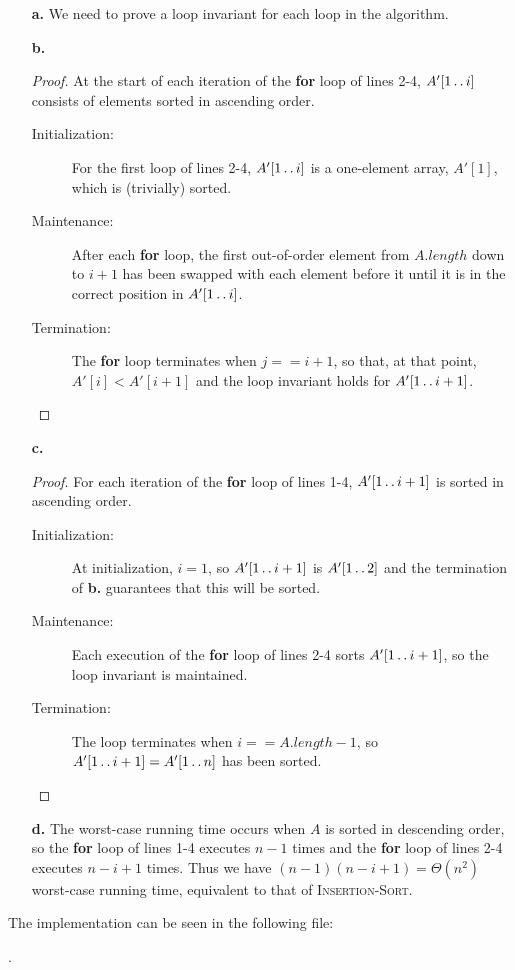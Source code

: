 
\begin{itemize}
    \item[\textbf{a.}] We need to prove a loop invariant for each loop in the algorithm.
    \item[\textbf{b.}]
        \begin{proof}
            At the start of each iteration of the \textbf{for} loop of lines 2-4, 
            $A'[1\mathinner{{\ldotp}\,{\ldotp}} i]$ consists of elements sorted in ascending order.
            \begin{description}
                \item[Initialization:] For the first loop of lines 2-4, $A'[1 \mathinner{{\ldotp}\,{\ldotp}} i]$
                    is a one-element array, $A'[1]$, which is (trivially) sorted.
                \item[Maintenance:] After each \textbf{for} loop, the first out-of-order
                    element from $A.\mathit{length}$ down to $i + 1$ has been swapped with
                    each element before it until it is in the correct position in 
                    $A'[1 \mathinner{{\ldotp}\,{\ldotp}} i]$.
                \item[Termination:] The \textbf{for} loop terminates when $j == i + 1$,          
                    so that, at that point, $A'[i] < A'[i + 1]$ and the loop invariant 
                    holds for $A'[1 \mathinner{{\ldotp}\,{\ldotp}} i + 1]$.
            \end{description}
        \end{proof}
    \item[\textbf{c.}]
        \begin{proof}
            For each iteration of the \textbf{for} loop of lines 1-4, $A'[1 \mathinner{{\ldotp}\,{\ldotp}} i + 1]$
            is sorted in ascending order.
            \begin{description}
                \item[Initialization:] At initialization, $i = 1$, so $A'[1 \mathinner{{\ldotp}\,{\ldotp}} i + 1]$
                    is $A'[1 \mathinner{{\ldotp}\,{\ldotp}} 2]$ and the termination of \textbf{b.} guarantees
                    that this will be sorted.
                \item[Maintenance:] Each execution of the \textbf{for} loop of lines 2-4
                    sorts $A'[1 \mathinner{{\ldotp}\,{\ldotp}} i + 1]$, so the loop invariant is maintained.
                \item[Termination:] The loop terminates when $i == A.\mathit{length} - 1$,
                    so $A'[1 \mathinner{{\ldotp}\,{\ldotp}} i + 1] = A'[1 \mathinner{{\ldotp}\,{\ldotp}} n]$ has been sorted.
            \end{description}
        \end{proof}
    \item[\textbf{d.}] The worst-case running time occurs when $A$ is sorted in descending
        order, so the \textbf{for} loop of lines 1-4 executes $n - 1$ times and the \textbf{for}
        loop of lines 2-4 executes $n - i + 1$ times. Thus we have 
        $(n - 1)(n - i + 1) = \Theta(n^2)$ worst-case running time, equivalent to that of 
        \textsc{Insertion-Sort}.
\end{itemize}

The implementation can be seen in the following file:

.
